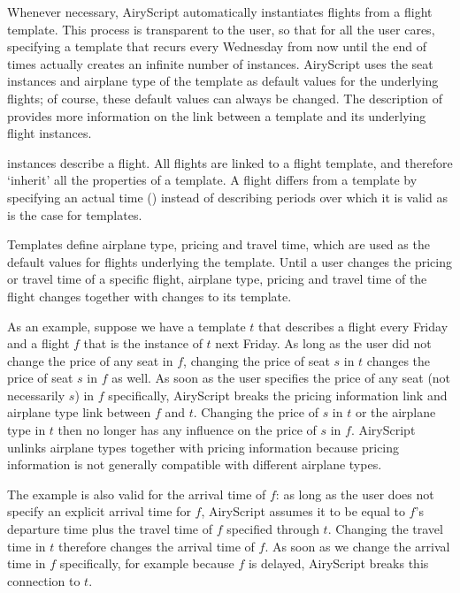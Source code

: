 \begin{description}
    Whenever necessary, AiryScript automatically instantiates flights from a
    flight template. This process is transparent to the user, so that for all
    the user cares, specifying a template that recurs every Wednesday from now
    until the end of times actually creates an infinite number of 
    instances. AiryScript uses the seat instances and airplane type of the
    template as default values for the underlying flights; of course, these
    default values can always be changed. The description of 
    provides more information on the link between a template and its underlying
    flight instances.

  \item[\dbf{Flight}] instances describe a flight. All flights are linked to a
    flight template, and therefore ‘inherit’ all the properties of a template. A
    flight differs from a template by specifying an actual time ()
    instead of describing periods over which it is valid as is the case for
    templates.

    Templates define airplane type, pricing and travel time, which are
    used as the default values for flights underlying the template. Until a user
    changes the pricing or travel time of a specific flight, airplane type,
    pricing and travel time of the flight changes together with changes to its
    template.
    
    As an example, suppose we have a template $t$ that describes a flight every
    Friday and a flight $f$ that is the instance of $t$ next Friday. As long as
    the user did not change the price of any seat in $f$, changing the price of
    seat $s$ in $t$ changes the price of seat $s$ in $f$ as well. As soon as the
    user specifies the price of any seat (not necessarily $s$) in $f$
    specifically, AiryScript breaks the pricing information link and airplane
    type link between $f$ and $t$. Changing the price of $s$ in $t$ or the
    airplane type in $t$ then no longer has any influence on the price of $s$ in
    $f$. AiryScript unlinks airplane types together with pricing information
    because pricing information is not generally compatible with different
    airplane types.
    
    The example is also valid for the arrival time of $f$: as long as the user
    does not specify an explicit arrival time  for $f$, AiryScript
    assumes it to be equal to $f$’s departure time  plus the travel
    time of $f$ specified through $t$. Changing the travel time in $t$ therefore
    changes the arrival time of $f$. As soon as we change the arrival time in
    $f$ specifically, for example because $f$ is delayed, AiryScript breaks this
    connection to $t$.
    

\end{description}
